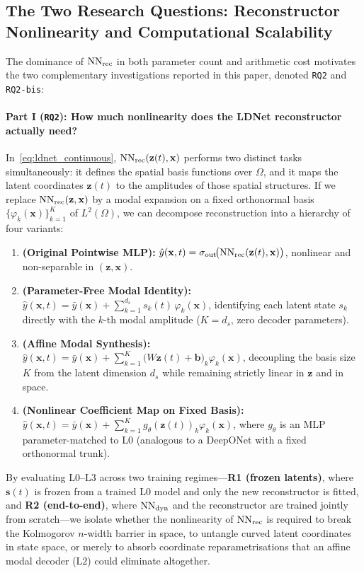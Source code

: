 \subsection{The Two Research Questions: Reconstructor Nonlinearity and Computational Scalability}

The dominance of $\mathrm{NN}_{\mathrm{rec}}$ in both parameter count and arithmetic cost motivates the two complementary investigations reported in this paper, denoted \texttt{RQ2} and \texttt{RQ2-bis}:

\paragraph{Part I (\texttt{RQ2}): How much nonlinearity does the LDNet reconstructor actually need?}
In~\eqref{eq:ldnet_continuous}, $\mathrm{NN}_{\mathrm{rec}}(\mathbf{z}(t),\mathbf{x})$ performs two distinct tasks simultaneously: it defines the spatial basis functions over $\Omega$, and it maps the latent coordinates $\mathbf{z}(t)$ to the amplitudes of those spatial structures. If we replace $\mathrm{NN}_{\mathrm{rec}}(\mathbf{z},\mathbf{x})$ by a modal expansion on a fixed orthonormal basis $\{\varphi_k(\mathbf{x})\}_{k=1}^K$ of $L^2(\Omega)$, we can decompose reconstruction into a hierarchy of four variants:
\begin{enumerate}[label=\textbf{L\arabic*},start=0,leftmargin=2.5em]
  \item \textbf{(Original Pointwise MLP):} $\hat{y}(\mathbf{x},t) = \sigma_{\mathrm{out}}\!\big(\mathrm{NN}_{\mathrm{rec}}(\mathbf{z}(t),\mathbf{x})\big)$, nonlinear and non-separable in $(\mathbf{z},\mathbf{x})$.
  \item \textbf{(Parameter-Free Modal Identity):} $\hat{y}(\mathbf{x},t) = \bar{y}(\mathbf{x}) + \sum_{k=1}^{d_s} s_k(t)\,\varphi_k(\mathbf{x})$, identifying each latent state $s_k$ directly with the $k$-th modal amplitude ($K = d_s$, zero decoder parameters).
  \item \textbf{(Affine Modal Synthesis):} $\hat{y}(\mathbf{x},t) = \bar{y}(\mathbf{x}) + \sum_{k=1}^K \big(W\mathbf{z}(t) + \mathbf{b}\big)_k \varphi_k(\mathbf{x})$, decoupling the basis size $K$ from the latent dimension $d_s$ while remaining strictly linear in $\mathbf{z}$ and in space.
  \item \textbf{(Nonlinear Coefficient Map on Fixed Basis):} $\hat{y}(\mathbf{x},t) = \bar{y}(\mathbf{x}) + \sum_{k=1}^K g_\theta(\mathbf{z}(t))_k \varphi_k(\mathbf{x})$, where $g_\theta$ is an MLP parameter-matched to $\mathrm{L0}$ (analogous to a DeepONet with a fixed orthonormal trunk).
\end{enumerate}
By evaluating $\mathrm{L0}$--$\mathrm{L3}$ across two training regimes---\textbf{R1 (frozen latents)}, where $\mathbf{s}(t)$ is frozen from a trained $\mathrm{L0}$ model and only the new reconstructor is fitted, and \textbf{R2 (end-to-end)}, where $\mathrm{NN}_{\mathrm{dyn}}$ and the reconstructor are trained jointly from scratch---we isolate whether the nonlinearity of $\mathrm{NN}_{\mathrm{rec}}$ is required to break the Kolmogorov $n$-width barrier in space, to untangle curved latent coordinates in state space, or merely to absorb coordinate reparametrisations that an affine modal decoder ($\mathrm{L2}$) could eliminate altogether.

